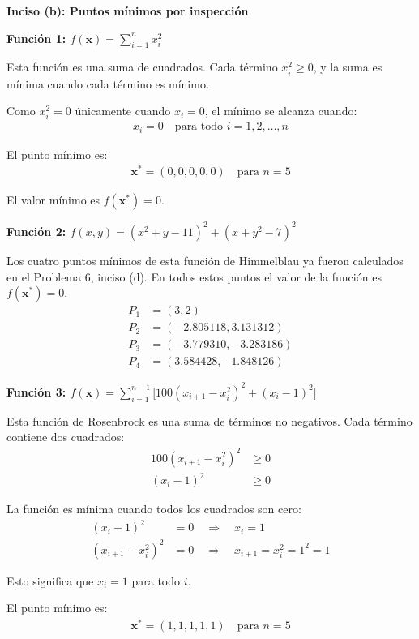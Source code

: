 \documentclass{article}
\begin{document}
\textbf{Inciso (b): Puntos mínimos por inspección}

\textbf{Función 1: $f(\mathbf{x}) = \sum_{i=1}^{n} x_i^{2}$}

Esta función es una suma de cuadrados. Cada término $x_i^2 \geq 0$, y la suma es mínima cuando cada término es mínimo.

Como $x_i^2 = 0$ únicamente cuando $x_i = 0$, el mínimo se alcanza cuando:
\begin{align}
x_i = 0 \quad \text{para todo } i = 1, 2, \ldots, n
\end{align}

El punto mínimo es:
\begin{align}
\mathbf{x}^* = (0, 0, 0, 0, 0) \quad \text{para } n = 5
\end{align}

El valor mínimo es $f(\mathbf{x}^*) = 0$.

\textbf{Función 2: $f(x,y) = (x^{2}+y-11)^{2} + (x+y^{2}-7)^{2}$}

Los cuatro puntos mínimos de esta función de Himmelblau ya fueron calculados en el Problema 6, inciso (d). En todos estos puntos el valor de la función es $f(\mathbf{x}^*) = 0$.
\begin{align}
P_1 &= (3, 2) \\
P_2 &= (-2.805118, 3.131312) \\
P_3 &= (-3.779310, -3.283186) \\
P_4 &= (3.584428, -1.848126)
\end{align}

\textbf{Función 3: $f(\mathbf{x}) = \sum_{i=1}^{n-1} \bigl[100(x_{i+1}-x_i^{2})^{2} + (x_i-1)^{2}\bigr]$}

Esta función de Rosenbrock es una suma de términos no negativos. Cada término contiene dos cuadrados:
\begin{align}
100(x_{i+1} - x_i^2)^2 &\geq 0 \\
(x_i - 1)^2 &\geq 0
\end{align}

La función es mínima cuando todos los cuadrados son cero:
\begin{align}
(x_i - 1)^2 &= 0 \quad \Rightarrow \quad x_i = 1 \\
(x_{i+1} - x_i^2)^2 &= 0 \quad \Rightarrow \quad x_{i+1} = x_i^2 = 1^2 = 1
\end{align}

Esto significa que $x_i = 1$ para todo $i$.

El punto mínimo es:
\begin{align}
\mathbf{x}^* = (1, 1, 1, 1, 1) \quad \text{para } n = 5
\end{align}
\end{document}
